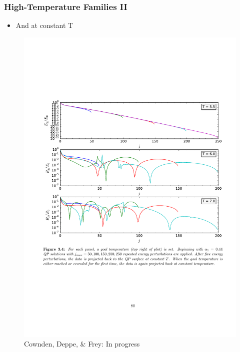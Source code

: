 \documentclass[mathserif,10pt]{beamer}
\newcommand{\bi}{\begin{itemize}}
\newcommand{\ei}{\end{itemize}}
\newcommand{\its}{\item}
\newcommand{\scr}{\scriptsize}
\begin{document}
\frame
{
  \frametitle{High-Temperature Families II}
  \bi
  \its And at \alert{constant T}
  \ei
   \begin{figure}
    \centering
    \includegraphics[scale=0.43]{constantTproj} \\ {\scr Cownden, Deppe, \& Frey: In progress}
  \end{figure}
}
\end{document}
